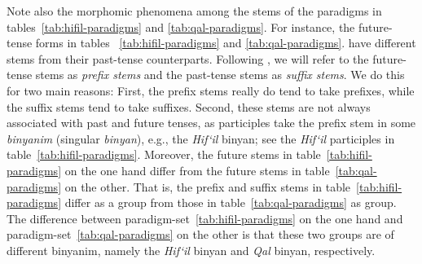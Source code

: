 {Note also the morphomic phenomena among the stems of the paradigms in tables~\ref{tab:hifil-paradigms} and \ref{tab:qal-paradigms}.
For instance, the future-tense forms in tables~ %
\ref{tab:hifil-paradigms} and \ref{tab:qal-paradigms}.
have different stems from their past-tense counterparts. Following \citet{vance:2004}, we will refer to the future-tense stems as \emph{prefix stems} and the past-tense stems as \emph{suffix stems}. We do this for two main reasons: First, the prefix stems really do tend to take prefixes, while the suffix stems tend to take suffixes. Second, these stems are not always associated with past and future tenses, as participles take the prefix stem in some \emph{binyanim} (singular \emph{binyan}), e.g., the \textit{Hif`il} binyan; see the \textit{Hif`il} participles in table~\ref{tab:hifil-paradigms}. 
Moreover, the future stems in table~\ref{tab:hifil-paradigms} on the one hand differ from the future stems in table~\ref{tab:qal-paradigms} on the other. That is, 
the prefix and suffix stems in table~\ref{tab:hifil-paradigms} differ as a group from those in table~\ref{tab:qal-paradigms} as group. The difference between paradigm-set~\ref{tab:hifil-paradigms} on the one hand and paradigm-set~\ref{tab:qal-paradigms} on the other is that these two groups are of different binyanim, namely the \emph{Hif`il} binyan and \emph{Qal} binyan, respectively.
 
}
